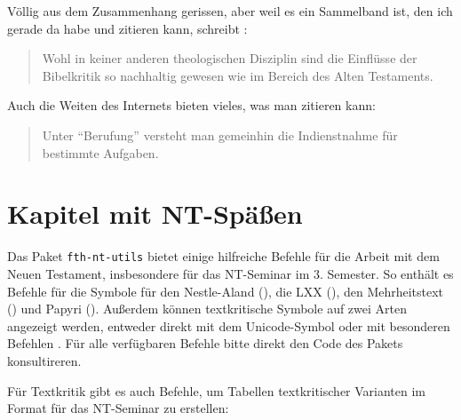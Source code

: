 \documentclass{scrreport}
\begin{document}
Völlig aus dem Zusammenhang gerissen, aber weil es ein Sammelband ist, den ich gerade da habe und zitieren kann, schreibt \citeauthor*{hilbrands}: \blockcquote[][49]{hilbrands}{Wohl in keiner anderen theologischen Disziplin sind die Einflüsse der Bibelkritik so nachhaltig gewesen wie im Bereich des Alten Testaments.}

Auch die Weiten des Internets bieten vieles, was man zitieren kann: \blockcquote[][]{strecker}{Unter \enquote{Berufung} versteht man gemeinhin die \textelp{} Indienstnahme für bestimmte Aufgaben.}

\chapter{Kapitel mit NT-Späßen}
Das Paket \texttt{fth-nt-utils} bietet einige hilfreiche Befehle für die Arbeit mit dem Neuen Testament, insbesondere für das NT-Seminar im 3. Semester. So enthält es Befehle für die Symbole für den Nestle-Aland (\na), die LXX (\lxx), den Mehrheitstext (\majoritytext) und Papyri (). Außerdem können textkritische Symbole auf zwei Arten angezeigt werden, entweder direkt mit dem Unicode-Symbol  oder mit besonderen Befehlen \tcOmissionStart{} \tcOmissionEnd. Für alle verfügbaren Befehle bitte direkt den Code des Pakets konsultireren.

Für Textkritik gibt es auch Befehle, um Tabellen textkritischer Varianten im Format für das NT-Seminar zu erstellen:
\begin{table}[ht]
    \centering
    \begin{textvarianttable}
    
    
    \end{textvarianttable}

    \caption{Varianten für Kol 2,10 }
\end{table}
\end{document}
